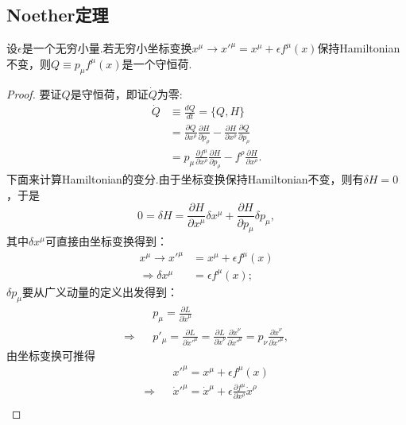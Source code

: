 	\subsection{Noether定理}
		\begin{theorem}
		设$\epsilon$是一个无穷小量.若无穷小坐标变换$x^\mu\rightarrow x'^\mu=x^\mu+\epsilon f^\mu(x)$保持Hamiltonian不变，则$Q\equiv p_\mu f^\mu(x)$是一个守恒荷.
		\end{theorem}
		\begin{proof}
		要证$Q$是守恒荷，即证$\dot{Q}$为零:
		\begin{equation*}
			\begin{split}
				\dot{Q}&\equiv\frac{dQ}{dt}=\{Q,H\}\\
				&=\frac{\partial Q}{\partial x^\rho}\frac{\partial H}{\partial p_\rho}-\frac{\partial H}{\partial x^\rho}\frac{\partial Q}{\partial p_\rho}\\
				&=p_\mu \frac{\partial f^\mu}{\partial x^\rho}\frac{\partial H}{\partial p_\rho}-f^\rho\frac{\partial H}{\partial x^\rho}.
			\end{split}
		\end{equation*}
		下面来计算Hamiltonian的变分.由于坐标变换保持Hamiltonian不变，则有$\delta H=0$，于是
		\begin{equation}\label{pr:delta H}
			0=\delta H=\frac{\partial H}{\partial x^\mu}\delta x^\mu+\frac{\partial H}{\partial p_\mu}\delta p_\mu,
		\end{equation}
		其中$\delta x^\mu$可直接由坐标变换得到：
		\begin{equation}\label{pr:delta x}
			\begin{split}
				x^\mu\rightarrow x'^\mu&=x^\mu+\epsilon f^\mu(x)\\
				\Rightarrow\delta x^\mu&=\epsilon f^\mu(x);
			\end{split}
		\end{equation}
		$\delta p_\mu$要从广义动量的定义出发得到：
		\begin{eqnarray*}
			&&p_\mu=\frac{\partial L}{\partial \dot{x}^\mu}\\
			\Rightarrow &&p'_\mu=\frac{\partial L}{\partial \dot{x}'^\mu}=\frac{\partial L}{\partial \dot{x}^\nu}\frac{\partial \dot{x}^\nu}{\partial \dot{x}'^\mu}=p_\nu\frac{\partial \dot{x}^\nu}{\partial \dot{x}'^\mu},
		\end{eqnarray*}
		由坐标变换可推得
		\begin{eqnarray*}
			&&x'^\mu=x^\mu+\epsilon f^\mu(x)\\
			\Rightarrow&&\dot{x}'^\mu=\dot{x}^\mu+\epsilon \frac{\partial f^\mu}{\partial x^\rho}\dot{x}^\rho\\

\end{eqnarray*}
\end{proof}
